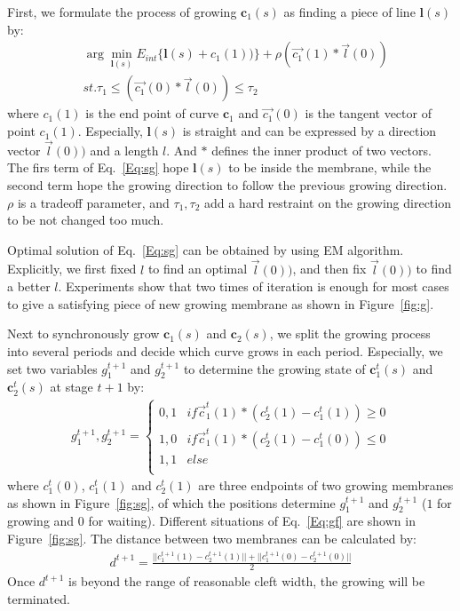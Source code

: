First, we formulate the process of growing $\mathbf{c}_1(s)$ as finding a piece of line $\mathbf{l}(s)$ by:
\begin{eqnarray}\label{Eq:sg}
&\arg\min_{\mathbf{l}(s)} E_{int}\{\mathbf{l}(s)+c_1(1))\}+\rho(\overrightarrow{c_1}(1)*\overrightarrow{l}(0))\\
&st. \tau_1\leq (\overrightarrow{c_1}(0)*\overrightarrow{l}(0))\leq \tau_2\nonumber
\end{eqnarray}
where $c_1(1)$ is the end point of curve $\mathbf{c}_1$ and $\overrightarrow{c_1}(0)$ is the tangent vector of point $c_1(1)$.
Especially, $\mathbf{l}(s)$ is straight and can be expressed by a direction vector $\overrightarrow{l}(0))$ and a length $l$.
And $*$ defines the inner product of two vectors.
The firs term of Eq.~\ref{Eq:sg} hope $\mathbf{l}(s)$ to be inside the membrane, while the second term hope the growing direction to follow the previous growing direction.
$\rho$ is a tradeoff parameter, and $\tau_1,\tau_2$ add a hard restraint on the growing direction to be not changed too much.

Optimal solution of Eq.~\ref{Eq:sg} can be obtained by using EM algorithm.
Explicitly, we first fixed $l$ to find an optimal $\overrightarrow{l}(0))$, and then fix $\overrightarrow{l}(0))$ to find a better $l$.
Experiments show that two times of iteration is enough for most cases to give a satisfying piece of new growing membrane as shown in Figure~\ref{fig:g}.

Next to synchronously grow $\mathbf{c}_1(s)$ and $\mathbf{c}_2(s)$, we split the growing process into several periods and decide which curve grows in each period.
Especially, we set two variables $g_1^{t+1}$ and $g_2^{t+1}$ to determine the growing state of $\mathbf{c}_1^{t}(s)$ and $\mathbf{c}_2^{t}(s)$ at stage $t+1$ by:
\begin{eqnarray}\label{Eq:gf}
g_1^{t+1},g_2^{t+1} = \left\{\begin{array}{cc}
0,1&if \overrightarrow{c}^t_1(1)*(c_2^t(1)-c_1^t(1))\geq 0 \\
1,0&if \overrightarrow{c}^t_1(1)*(c_2^t(1)-c_1^t(0))\leq 0\\
1,1& else\\
\end{array}\right.
\end{eqnarray}
where $c_1^t(0)$, $c_1^t(1)$ and $c_2^t(1)$ are three endpoints of two growing membranes as shown in Figure~\ref{fig:sg}, of which the positions determine $g_1^{t+1}$ and $g_2^{t+1}$ ($1$ for growing and $0$ for waiting).
Different situations of Eq.~\ref{Eq:gf} are shown in Figure~\ref{fig:sg}.
The distance between two membranes can be calculated by:
\begin{eqnarray}\label{Eq:d}
d^{t+1} = \frac{||c_1^{t+1}(1)-c_2^{t+1}(1)||+ ||c_1^{t+1}(0)-c_2^{t+1}(0)||}{2}
\end{eqnarray}
Once $d^{t+1}$ is beyond the range of reasonable cleft width, the growing will be terminated.

